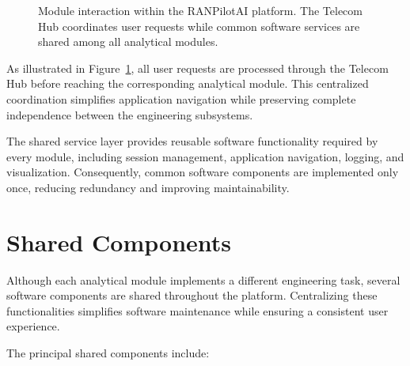 \begin{figure}[H]

\caption{Module interaction within the RANPilotAI platform. The Telecom Hub coordinates user requests while common software services are shared among all analytical modules.}

\label{fig:module_interaction}

\end{figure}

As illustrated in Figure~\ref{fig:module_interaction}, all user requests are processed through the Telecom Hub before reaching the corresponding analytical module. This centralized coordination simplifies application navigation while preserving complete independence between the engineering subsystems.

The shared service layer provides reusable software functionality required by every module, including session management, application navigation, logging, and visualization. Consequently, common software components are implemented only once, reducing redundancy and improving maintainability.

\section{Shared Components}

Although each analytical module implements a different engineering task, several software components are shared throughout the platform. Centralizing these functionalities simplifies software maintenance while ensuring a consistent user experience.

The principal shared components include:

